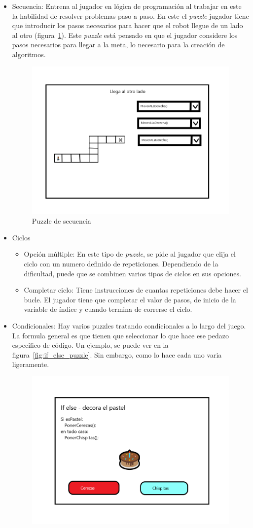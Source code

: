 \begin{itemize}
    \item Secuencia: Entrena al jugador en lógica de programación al trabajar en este la habilidad de resolver problemas paso a paso. En este el \textit{puzzle} jugador tiene que introducir los pasos necesarios para hacer que el robot llegue de un lado al otro (figura~\ref{fig:puzzle_secuencia}). Este \textit{puzzle} está pensado en que el jugador considere los pasos necesarios para llegar a la meta, lo necesario para la creación de algoritmos.
    \begin{figure}[H]
        \centering
        \includegraphics[width=0.5\linewidth]{images/PuzzleSecuencia.png}
        \caption{Puzzle de secuencia}
        \label{fig:puzzle_secuencia}
    \end{figure}
    \item Ciclos
    \begin{itemize}
        \item Opción múltiple: En este tipo de \textit{puzzle}, se pide al jugador que elija el ciclo con un numero definido de repeticiones. Dependiendo de la dificultad, puede que se combinen varios tipos de ciclos en sus opciones. 
        \item Completar ciclo: Tiene instrucciones de cuantas repeticiones debe hacer el bucle. El jugador tiene que completar el valor de pasos, de inicio de la variable de índice y cuando termina de correrse el ciclo.
    \end{itemize}
    \item Condicionales: Hay varios puzzles tratando condicionales a lo largo del juego. La formula general es que tienen que seleccionar lo que hace ese pedazo especifico de código. Un ejemplo, se puede ver en la figura~\ref{fig:if_else_puzzle}. Sin embargo, como lo hace cada uno varia ligeramente.
    \begin{figure}[H]
                \centering
                \includegraphics[width=0.5\linewidth]{images/PuzzleIfElse.png}

\end{figure}
\end{itemize}

